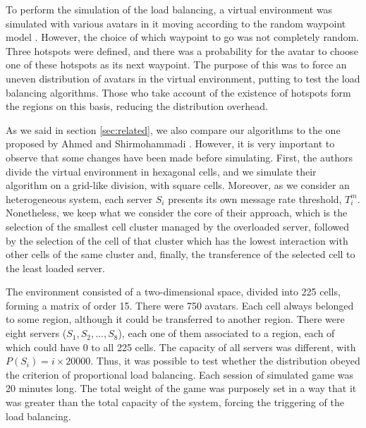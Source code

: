 To perform the simulation of the load balancing, a virtual environment was simulated with various avatars in it moving according to the random waypoint model \cite{bettstetter2004spr}. However, the choice of which waypoint to go was not completely random. Three hotspots were defined, and there was a probability for the avatar to choose one of these hotspots as its next waypoint. The purpose of this was to force an uneven distribution of avatars in the virtual environment, putting to test the load balancing algorithms. Those who take account of the existence of hotspots form the regions on this basis, reducing the distribution overhead.

As we said in section \ref{sec:related}, we also compare our algorithms to the one proposed by Ahmed and Shirmohammadi \cite{ahmed2008mol}. However, it is very important to observe that some changes have been made before simulating. First, the authors divide the virtual environment in hexagonal cells, and we simulate their algorithm on a grid-like division, with square cells. Moreover, as we consider an heterogeneous system, each server $S_i$ presents its own message rate threshold, $T_i^m$.
%
Nonetheless, we keep what we consider the core of their approach, which is the selection of the smallest cell cluster managed by the overloaded server, followed by the selection of the cell of that cluster which has the lowest interaction with other cells of the same cluster and, finally, the transference of the selected cell to the least loaded server.

The environment consisted of a two-dimensional space, divided into 225 cells, forming a matrix of order 15. There were 750 avatars. Each cell always belonged to some region, although it could be transferred to another region. There were eight servers ($S_1, S_2, ..., S_8$), each one of them associated to a region, each of which could have 0 to all 225 cells. The capacity of all servers was different, with $P(S_i) = i \times 20000$. Thus, it was possible to test whether the distribution obeyed the criterion of proportional load balancing. Each session of simulated game was 20 minutes long. The total weight of the game was purposely set in a way that it was greater than the total capacity of the system, forcing the triggering of the load balancing.

